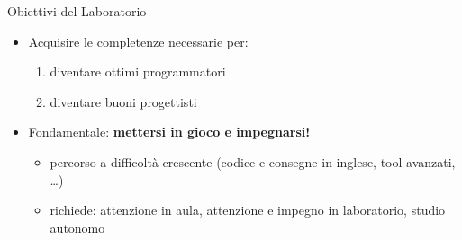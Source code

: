 \documentclass[presentation]{beamer}
\begin{document}
\begin{frame}{Obiettivi del Laboratorio}
\begin{itemize}\itemsep10pt
\item Acquisire le completenze necessarie per:
\begin{enumerate}
 \item diventare ottimi programmatori
 \item diventare buoni progettisti
\end{enumerate}
\item Fondamentale: \textbf{mettersi in gioco e impegnarsi!}
\begin{itemize}
\item percorso a difficoltà crescente (codice e consegne in inglese, tool avanzati, \dots)
\item richiede: attenzione in aula, attenzione e impegno in laboratorio, studio autonomo
\end{itemize}
\end{itemize}
\end{frame}
  
\end{document}
